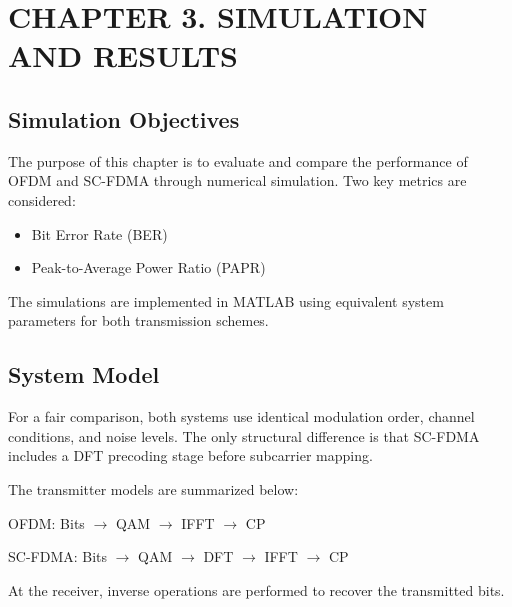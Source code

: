\section*{CHAPTER 3. SIMULATION AND RESULTS}

\setcounter{section}{3}
\setcounter{subsection}{0}
\setcounter{figure}{0}
\setcounter{table}{0}
\setcounter{equation}{0}

\subsection{Simulation Objectives}

The purpose of this chapter is to evaluate and compare the performance of
OFDM and SC-FDMA through numerical simulation. Two key metrics are
considered:

\begin{itemize}
    \item Bit Error Rate (BER)
    \item Peak-to-Average Power Ratio (PAPR)
\end{itemize}

The simulations are implemented in MATLAB using equivalent system
parameters for both transmission schemes.

\subsection{System Model}

For a fair comparison, both systems use identical modulation order,
channel conditions, and noise levels. The only structural difference is
that SC-FDMA includes a DFT precoding stage before subcarrier mapping.

The transmitter models are summarized below:

\begin{center}
OFDM: Bits $\rightarrow$ QAM $\rightarrow$ IFFT $\rightarrow$ CP
\end{center}

\begin{center}
SC-FDMA: Bits $\rightarrow$ QAM $\rightarrow$ DFT $\rightarrow$
IFFT $\rightarrow$ CP
\end{center}

At the receiver, inverse operations are performed to recover the
transmitted bits.

